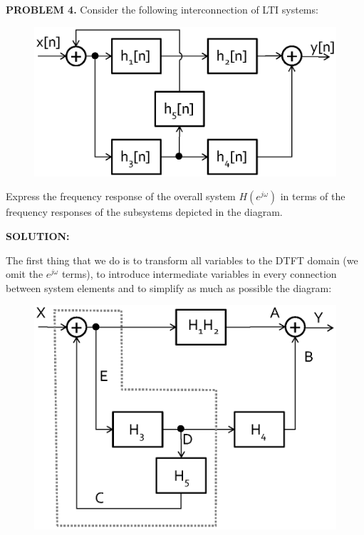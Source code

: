 \documentclass[a4paper,11pt,oneside]{article}
\begin{document}
\vspace{1cm}







\textbf{PROBLEM 4.} Consider the following interconnection of LTI systems:

\begin{figure}[ht!]
\centering
\includegraphics[width=.7\textwidth]{fig3.eps}
\end{figure}

Express the frequency response of the overall system $H(e^{j\omega})$ in terms of the frequency responses of the subsystems depicted in the diagram.

\vspace{1cm}
 
\textbf{SOLUTION:}

The first thing that we do is to transform all variables to the DTFT domain (we omit the $e^{j\omega}$ terms), to introduce intermediate variables in every connection between system elements and to simplify as much as possible the diagram:

\begin{figure}[ht!]
\centering
\includegraphics[width=.7\textwidth]{fig6.eps}
\end{figure}
\end{document}
